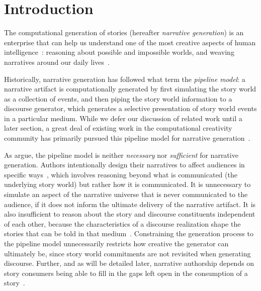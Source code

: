 \section{Introduction}

The computational generation of stories (hereafter {\em narrative
generation}) is an enterprise that can help us understand one of the most
creative aspects of human intelligence~\cite{boyd2009origin}: reasoning
about possible and impossible worlds, and weaving narratives around our
daily lives~\cite{herman2013storytelling}.

Historically, narrative generation has followed what
 term the \emph{pipeline model}: a narrative artifact is
computationally generated by first simulating the story world as a collection of
events, and then piping the story world information to a discourse generator, 
which generates a selective presentation of story world events in a particular 
medium. While we defer our discussion of related  work until a later section, 
a great deal of existing work in the computational creativity community has 
primarily pursued this pipeline model for narrative 
generation~\cite{gervas2009computational}. 

As \citeauthor{ronfard2014story} argue, the pipeline model is neither
\emph{necessary} nor \emph{sufficient} for narrative generation. 
Authors intentionally design their narratives to affect audiences in
specific ways~\cite{chatman1980story,bordwell1989making}, which involves
reasoning beyond what is communicated (the underlying story world) but
rather how it is communicated. It is unnecessary to simulate an aspect of
the narrative universe that is never communicated to the audience, if it
does not inform the ultimate delivery of the narrative artifact. It is also
insufficient to reason about the story and discourse constituents
independent of each other, because the characteristics of a discourse
realization shape the stories that can be told in that
medium~\cite{herman2004toward}. Constraining the generation process to the
pipeline model unnecessarily restricts how creative the generator can
ultimately be, since story world commitments are not revisited when
generating discourse. Further, and as will be detailed later, narrative
authorship depends on story consumers being able to fill in the gaps left
open in the consumption of a
story~\cite{saraceni2016relatedness,magliano2016filling}.

